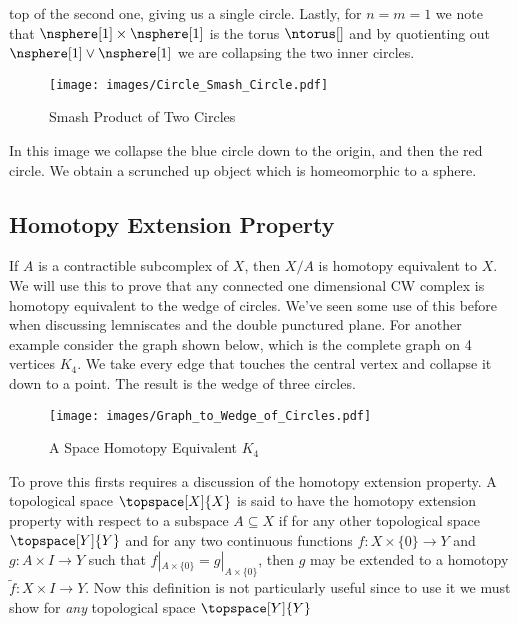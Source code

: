         top of the second one, giving us a single circle. Lastly, for
        $n=m=1$ we note that $\nsphere[1]\times\nsphere[1]$ is the torus
        $\ntorus[]$ and by quotienting out $\nsphere[1]\lor\nsphere[1]$
        we are collapsing the two inner circles.
        \begin{figure}[H]
            \centering
            \captionsetup{type=figure}
            \texttt{[image: images/Circle\_Smash\_Circle.pdf]}
            \caption{Smash Product of Two Circles}
            \label{fig:S2_Smash_S2}
        \end{figure}
        In this image we collapse the blue circle down to the origin,
        and then the red circle. We obtain a scrunched up object which
        is homeomorphic to a sphere.
    \subsection{Homotopy Extension Property}
        If $A$ is a contractible subcomplex of $X$, then $X/A$ is
        homotopy equivalent to $X$. We will use this to prove that any
        connected one dimensional CW complex is homotopy equivalent to
        the wedge of circles. We've seen some use of this before when
        discussing lemniscates and the double punctured plane. For
        another example consider the graph shown below, which is the
        complete graph on 4 vertices $K_{4}$. We take every edge that
        touches the central vertex and collapse it down to a point. The
        result is the wedge of three circles.
        \begin{figure}[H]
            \centering
            \captionsetup{type=figure}
            \texttt{[image: images/Graph\_to\_Wedge\_of\_Circles.pdf]}
            \caption{A Space Homotopy Equivalent $K_{4}$}
            \label{fig:Homotopy_Equivalent_to_K4}
        \end{figure}
        To prove this firsts requires a discussion of the homotopy
        extension property. A topological space $\topspace[X]{X}$ is
        said to have the homotopy extension property with respect to a
        subspace $A\subseteq{X}$ if for any other topological space
        $\topspace[Y]{Y}$ and for any two continuous functions
        $f:X\times\{0\}\rightarrow{Y}$ and $g:A\times{I}\rightarrow{Y}$
        such that $f|_{A\times\{0\}}=g|_{A\times\{0\}}$, then $g$ may be
        extended to a homotopy $\tilde{f}:X\times{I}\rightarrow{Y}$. Now
        this definition is not particularly useful since to use it we
        must show for \textit{any} topological space $\topspace[Y]{Y}$
